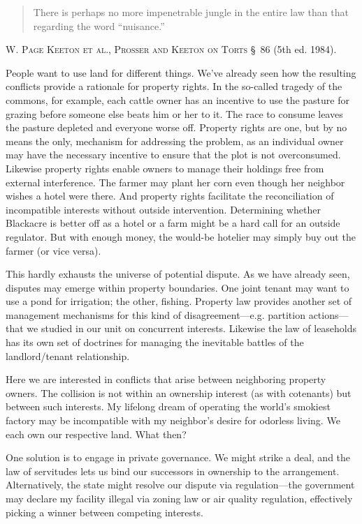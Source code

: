 \begin{quote}
There is perhaps no more impenetrable jungle in the entire law than that
regarding the word ``nuisance.''
\end{quote}
\textsc{W. Page Keeton et al.}, \textsc{Prosser and Keeton on Torts}
\S~86 (5th ed. 1984).


People want to use land for different things. We've already seen how the
resulting conflicts provide a rationale for property rights. In the so-called
tragedy of the commons, for example, each cattle owner has an incentive to use
the pasture for grazing before someone else beats him or her to it. The race to
consume leaves the pasture depleted and everyone worse off. Property rights are
one, but by no means the only, mechanism for addressing the problem, as an
individual owner may have the necessary incentive to ensure that the plot is not
overconsumed. Likewise property rights enable owners to manage their holdings
free from external interference. The farmer may plant her corn even though her
neighbor wishes a hotel were there. And property rights facilitate the
reconciliation of incompatible interests without outside intervention.
Determining whether Blackacre is better off as a hotel or a farm might be a hard
call for an outside regulator. But with enough money, the would-be hotelier may
simply buy out the farmer (or vice versa).


This hardly exhausts the universe of potential dispute. As we have already seen,
disputes may emerge within property boundaries. One joint tenant may want to use
a pond for irrigation; the other, fishing. Property law provides another set of
management mechanisms for this kind of disagreement---e.g. partition
actions---that we studied in our unit on concurrent interests. Likewise the law
of leaseholds has its own set of doctrines for managing the inevitable battles
of the landlord/tenant relationship.

Here we are interested in conflicts that arise between neighboring property
owners. The collision is not within an ownership interest (as with cotenants)
but between such interests. My lifelong dream of operating the world's smokiest
factory may be incompatible with my neighbor's desire for odorless living. We
each own our respective land. What then? 

One solution is to engage in private governance. We might strike a deal, and the
law of servitudes lets us bind our successors in ownership to the arrangement.
Alternatively, the state might resolve our dispute via regulation---the
government may declare my facility illegal via zoning law or air quality
regulation, effectively picking a winner between competing interests. 

